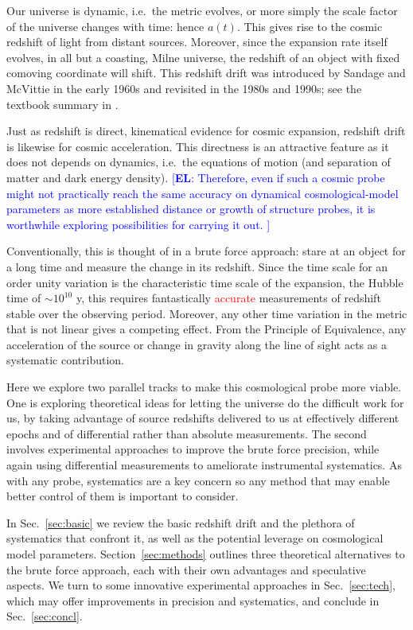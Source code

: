 \documentclass[preprint2, 10pt]{aastex}
\newcommand{\eric}[1]{\textcolor{blue}{[{\bf EL}: #1]}}
\begin{document}
Our universe is dynamic, i.e.\ the metric evolves, or more simply the 
scale factor of the universe changes with time: hence $a(t)$.  This 
gives rise to the cosmic redshift of light from distant sources.  Moreover, 
since the expansion rate itself evolves, in all but a coasting, Milne 
universe, the redshift of an object with fixed comoving coordinate will shift.  This redshift drift was 
introduced by Sandage \citep{sandage} and McVittie \citep{mcvittie} in the 
early 1960s and revisited in the 1980s and 1990s; see the textbook 
summary in \citet{fpoc}. 

Just as redshift is direct, kinematical evidence for cosmic expansion, 
redshift drift is likewise for cosmic acceleration.  This directness is 
an attractive feature as it does not depends on dynamics, i.e.\ the equations 
of motion (and separation of matter and dark energy density). 
\eric{Therefore, 
even if such a cosmic probe might not practically reach the same 
accuracy on dynamical cosmological-model parameters as more established
distance or growth of structure probes,  it is worthwhile exploring possibilities 
for carrying it out. 
}

Conventionally, this is thought of in a brute force approach: stare at an 
object for a long time and measure the change in its redshift.  
Since the time scale for an order unity variation is the characteristic 
time scale of the expansion, the Hubble time of $\sim10^{10}$ y, this 
requires fantastically \textcolor{red}{accurate} measurements of redshift stable over the 
observing period.  Moreover, any other time variation in the metric that 
is not linear gives a competing effect.  From the Principle of Equivalence, 
any acceleration of the source or change in gravity along the line of sight 
acts as a systematic contribution. 

Here we explore two parallel tracks to make this cosmological probe more 
viable. One is exploring theoretical ideas for letting the universe do the 
difficult work for us, by taking advantage of source redshifts delivered 
to us at effectively different epochs and of differential rather than absolute 
measurements.  The second involves experimental approaches to improve the 
brute force precision, while again using differential measurements to 
ameliorate instrumental systematics. As with any probe, systematics are a 
key concern so any method that may enable better control of them is 
important to consider. 

In Sec.~\ref{sec:basic} we review the basic redshift drift and the plethora 
of systematics that confront it, as well as the potential leverage on 
cosmological model parameters.  Section~\ref{sec:methods} outlines three 
theoretical alternatives to the brute force approach, each with their own 
advantages and speculative aspects. 
We turn to some innovative experimental approaches in Sec.~\ref{sec:tech}, 
which may offer improvements in precision and systematics, and conclude in 
Sec.~\ref{sec:concl}. 
\end{document}
